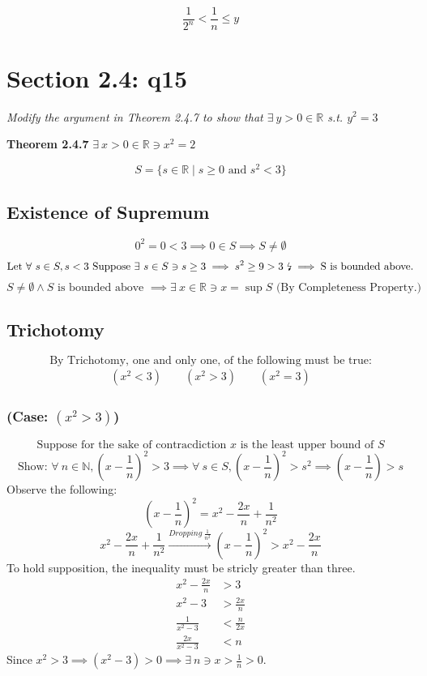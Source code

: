 \documentclass[11pt]{article}
\newcommand{\question}[1]{
    \begin{mdframed}[
        linecolor=gray,       %
        linewidth=0.5pt,      %
        innertopmargin=10pt,  %
        innerbottommargin=10pt %
    ]
    \centering \itshape \color{gray} #1
    \end{mdframed}
}
\theoremstyle{plain}
\begin{document}
\[
	\frac{1}{2^n} < \frac{1}{n} \leq y
\]

\section*{Section 2.4: q15}
\question{Modify the argument in Theorem 2.4.7 to show that $\exists ~y > 0 \in \mathbb{R}$ s.t. $y^2=3$}
\begin{blockquote} \textbf{Theorem 2.4.7} \textit{$\exists ~x > 0 \in \mathbb{R} \ni x^2 = 2$}  \end{blockquote}
\[
	S = \{ s \in \mathbb{R} \mid s \geq 0 \text{ and } s^2 < 3 \}
\]
\subsection*{Existence of Supremum}
\[ 0^2 = 0 < 3 \implies 0 \in S \implies S \neq \emptyset \]
\[ \text{Let } \forall ~s \in S, s < 3 \text{ Suppose } \exists ~s \in S \ni s \geq 3 \implies  s^2 \geq  9 > 3 \text{ \lightning} \implies \text{S is bounded above.} \]
\[ S \neq \emptyset \land  S \text{ is bounded above } \implies \exists ~x \in \mathbb{R} \ni x=\sup S \text{ (By Completeness Property.)} \]

\subsection*{Trichotomy}
\[ \text{By Trichotomy, one and only one, of the following must be true:} \]
\[
	\begin{aligned}
		(x^2<3)  \quad\quad (x^2>3) \quad\quad (x^2=3)
	\end{aligned}
\]
\subsubsection*{(Case: $(x^2>3)$)}
\[
	\text{Suppose for the sake of contracdiction $x$ is the least upper bound of $S$}
\]
\[
	\text{Show: } \forall ~n \in \mathbb{N}, (x-\frac{1}{n})^2 > 3 \implies \forall ~s \in S, (x-\frac{1}{n})^2 > s^2  \implies  (x-\frac{1}{n}) > s
\]
Observe the following:
\[
	(x-\frac{1}{n})^2 = x^2 - \frac{2x}{n} + \frac{1}{n^2}
\]
\[
	x^2 - \frac{2x}{n} + \frac{1}{n^2} \xrightarrow{Dropping ~\frac{1}{n^2}} (x-\frac{1}{n})^2 > x^2- \frac{2x}{n}
\]
To hold supposition, the inequality must be stricly greater than three.
\[
	\begin{aligned}
		x^2 - \frac{2x}{n} & > 3            \\
		x^2 - 3            & > \frac{2x}{n} \\
		\frac{1}{x^2-3}    & < \frac{n}{2x} \\
		\frac{2x}{x^2-3}   & < n
	\end{aligned}
\]
Since $x^2 > 3 \implies  (x^2-3) > 0 \implies \exists ~n \ni x>\frac{1}{n} > 0$.
\end{document}
